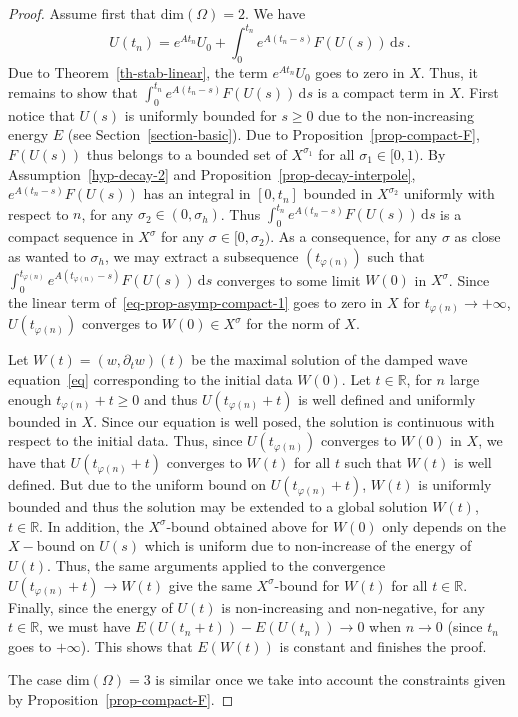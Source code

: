 \documentclass[10pt]{amsart}
\theoremstyle{definition}\newtheorem{defi}[theo]{Definition}\newtheorem{rema}[theo]{Remark}\newtheorem{exam}[theo]{Example}\newtheorem{exem}[theo]{Example}\newtheorem{nota}[theo]{Notation}
\newcommand{\RR}{\mathbb{R}}
\newcommand{\drm}{\mathrm{d}}
\begin{document}
\begin{proof}
Assume first that dim$(\Omega)=2$. We have
\begin{equation}\label{eq-prop-asymp-compact-1}
U(t_n)=e^{At_n}U_0 + \int_0^{t_n} e^{A(t_n-s)}F(U(s))\,\drm s\,.
\end{equation}
Due to Theorem~\ref{th-stab-linear}, the term $e^{At_n}U_0$ goes to zero in $X$. Thus, it remains to show that $\int_0^{t_n} e^{A(t_n-s)}F(U(s))\,\drm s$ is a compact term in $X$. First notice that $U(s)$ is uniformly bounded for $s\geq 0$ due to the non-increasing energy $E$ (see Section~\ref{section-basic}). Due to Proposition~\ref{prop-compact-F}, $F(U(s))$ thus belongs to a bounded set of $X^{\sigma_1}$ for all $\sigma_1\in [0,1)$. By Assumption~\eqref{hyp-decay-2} and Proposition~\ref{prop-decay-interpole}, $e^{A(t_n-s)}F(U(s))$ has an integral in $[0,t_n]$ bounded in $X^{\sigma_2}$ uniformly with respect to $n$, for any $\sigma_2 \in (0,\sigma_h)$. Thus $\int_0^{t_n} e^{A(t_n-s)}F(U(s))\,\drm s$ is a compact sequence in $X^\sigma$ for any $\sigma\in [0,\sigma_2)$. As a consequence, for any $\sigma$ as close as wanted to $\sigma_h$, we may extract a subsequence $(t_{\varphi(n)})$ such that $\int_0^{t_{\varphi(n)}} e^{A(t_{\varphi(n)}-s)}F(U(s))\,\drm s$ converges to some limit $W(0)$ in $X^\sigma$. Since the linear term of~\eqref{eq-prop-asymp-compact-1} goes to zero in $X$ for $t_{\varphi(n)}\rightarrow +\infty$, $U(t_{\varphi(n)})$ converges to $W(0)\in X^\sigma$ for the norm of $X$.

Let $W(t)=(w,\partial_t w)(t)$ be the maximal solution of the damped wave equation~\eqref{eq} corresponding to the initial data $W(0)$. Let $t\in\RR$, for $n$ large enough $t_{\varphi(n)}+t\geq 0$ and thus $U(t_{\varphi(n)}+t)$ is well defined and uniformly bounded in $X$. Since our equation is well posed, the solution is continuous with respect to the initial data. Thus, since $U(t_{\varphi(n)})$ converges to $W(0)$ in $X$, we have that $U(t_{\varphi(n)}+t)$ converges to $W(t)$ for all $t$ such that $W(t)$ is well defined. But due to the uniform bound on $U(t_{\varphi(n)}+t)$, $W(t)$ is uniformly bounded and thus the solution may be extended to a global solution $W(t)$, $t\in\RR$. In addition, the $X^\sigma$-bound obtained above for $W(0)$ only depends on the $X-$bound on $U(s)$ which is uniform due to non-increase of the energy of $U(t)$. Thus, the same arguments applied to the convergence $U(t_{\varphi(n)}+t)\rightarrow W(t)$ give the same $X^\sigma$-bound for $W(t)$ for all $t\in\RR$. Finally, since the energy of $U(t)$ is non-increasing and non-negative, for any $t\in\RR$, we must have $E(U(t_n+t))-E(U(t_n))\rightarrow 0$ when $n\rightarrow 0$ (since $t_n$ goes to $+\infty$). This shows that $E(W(t))$ is constant and finishes the proof.

The case dim$(\Omega)=3$ is similar once we take into account the constraints given by Proposition~\ref{prop-compact-F}.
\end{proof}
\end{document}
